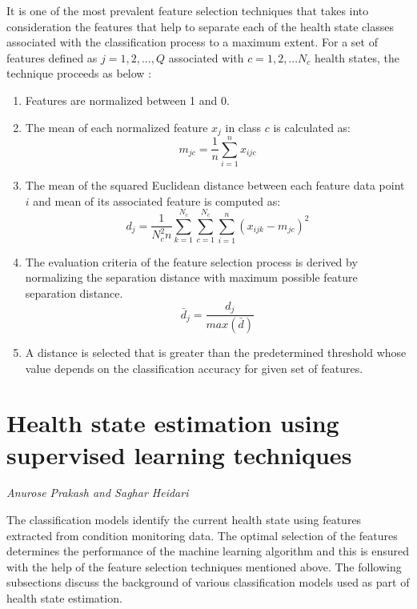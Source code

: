 It is one of the most prevalent feature selection techniques that takes into consideration the features that help to separate each of the health state classes associated with the classification process to a maximum extent. For a set of features defined as $j = 1,2,...,Q$ associated with $c = 1,2,...N_c$ health states, the technique proceeds as below \cite{DBLP:phd/dnb/Kimotho16}:
\begin{enumerate}
    \item Features are normalized between 1 and 0.
    \item The mean of each normalized feature $x_j$ in class $c$ is calculated as:
    \begin{equation}
        m_{jc} = \frac{1}{n} \sum_{i=1}^n x_{ijc}
    \end{equation}
    \item The mean of the squared Euclidean distance between each feature data point $i$ and mean of its associated  feature is computed as:
    \begin{equation}
        d_j = \frac{1}{N_c^2 n}\sum_{k=1}^{N_c} \sum_{c=1}^{N_c} \sum_{i=1}^n (x_{ijk} - m_{jc})^2
    \end{equation}
    \item The evaluation criteria of the feature selection process is derived by normalizing the separation distance with maximum possible feature separation distance.
    \begin{equation}
        \bar d_j = \frac{d_j}{max(\bar d)}
    \end{equation}
    \item A distance is selected that is greater than the predetermined threshold whose value depends on the classification accuracy for given set of features.
\end{enumerate}

\section{Health state estimation using supervised learning techniques}
\hfill{\normalsize\emph{Anurose Prakash and Saghar Heidari}}
\label{sec:system:sec4}

The classification models identify the current health state using features extracted from condition monitoring data. The optimal selection of the features determines the performance of the machine learning algorithm and this is ensured with the help of the feature selection techniques mentioned above. The following subsections discuss the background of various classification models used as part of health state estimation.\newline


